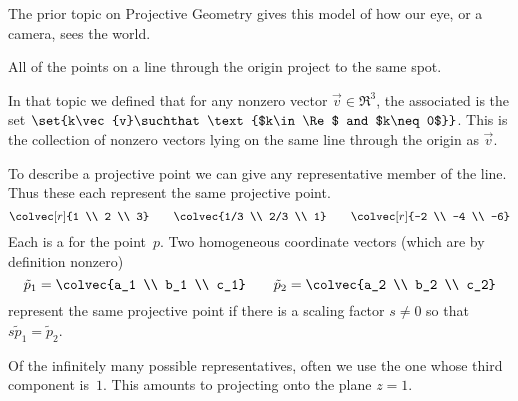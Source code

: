 The prior topic on Projective Geometry gives this model of 
how our eye, or a camera, sees the world.
\begin{center} 
\end{center}
All of the points on a line through the origin project to the same 
spot.

In that topic we defined that
for any nonzero vector $\vec{v}\in\Re^3$, the associated 
is the set $\set{k\vec{v}\suchthat \text{$k\in\Re$ and $k\neq 0$}}$.
This is the collection of nonzero vectors lying on the same line through the
origin as $\vec{v}$.

To describe a projective point we can give any representative member 
of the line. 
Thus these each represent the same projective point.
\begin{equation*}
  \colvec[r]{1 \\ 2 \\ 3}
  \qquad
  \colvec{1/3 \\ 2/3 \\ 1}
  \qquad
  \colvec[r]{-2 \\ -4 \\ -6}
\end{equation*} 
Each is a
%
for the point~$p$. 
Two homogeneous coordinate vectors (which are by definition nonzero)
\begin{equation*}
  \tilde{p}_1=\colvec{a_1 \\ b_1 \\ c_1}
  \qquad
  \tilde{p}_2=\colvec{a_2 \\ b_2 \\ c_2}
\end{equation*}
represent the same projective point if there is a scaling factor
$s\neq 0$ so that $s\tilde{p}_1=\tilde{p}_2$.

Of the infinitely many possible representatives,
often we use the one whose third component is~$1$.
This amounts to projecting onto the plane $z=1$.
\begin{center} 
\end{center}

